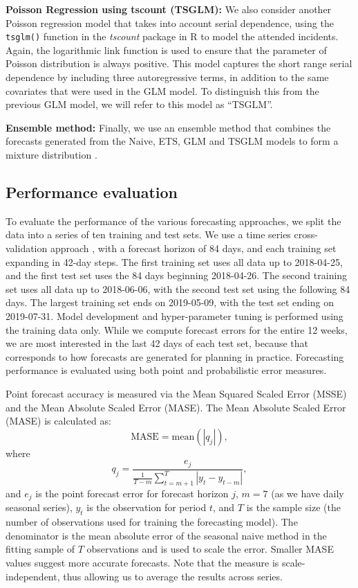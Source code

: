 \documentclass[
  authoryear,
  preprint,
  3p]{elsarticle}
\begin{document}
\textbf{Poisson Regression using tscount (TSGLM):} We also consider
another Poisson regression model that takes into account serial
dependence, using the \texttt{tsglm()} function in the \emph{tscount}
package in R \citep{JSSv082i05} to model the attended incidents. Again,
the logarithmic link function is used to ensure that the parameter of
Poisson distribution is always positive. This model captures the short
range serial dependence by including three autoregressive terms, in
addition to the same covariates that were used in the GLM model. To
distinguish this from the previous GLM model, we will refer to this
model as ``TSGLM''.

\textbf{Ensemble method:} Finally, we use an ensemble method that
combines the forecasts generated from the Naive, ETS, GLM and TSGLM
models to form a mixture distribution \citep{combinations}.

\hypertarget{performance-evaluation}{%
\subsection{Performance evaluation}\label{performance-evaluation}}

To evaluate the performance of the various forecasting approaches, we
split the data into a series of ten training and test sets. We use a
time series cross-validation approach \citep{hyndman2021forecasting},
with a forecast horizon of 84 days, and each training set expanding in
42-day steps. The first training set uses all data up to 2018-04-25, and
the first test set uses the 84 days beginning 2018-04-26. The second
training set uses all data up to 2018-06-06, with the second test set
using the following 84 days. The largest training set ends on
2019-05-09, with the test set ending on 2019-07-31. Model development
and hyper-parameter tuning is performed using the training data only.
While we compute forecast errors for the entire 12 weeks, we are most
interested in the last 42 days of each test set, because that
corresponds to how forecasts are generated for planning in practice.
Forecasting performance is evaluated using both point and probabilistic
error measures.

Point forecast accuracy is measured via the Mean Squared Scaled Error
(MSSE) and the Mean Absolute Scaled Error (MASE). The Mean Absolute
Scaled Error (MASE) \citep{HK06} is calculated as: \[
  \text{MASE} = \text{mean}(|q_{j}|),
\] where \[
  q_{j} = \frac{ e_{j}}
 {\displaystyle\frac{1}{T-m}\sum_{t=m+1}^T |y_{t}-y_{t-m}|},
\] and \(e_{j}\) is the point forecast error for forecast horizon \(j\),
\(m = 7\) (as we have daily seasonal series), \(y_t\) is the observation
for period \(t\), and \(T\) is the sample size (the number of
observations used for training the forecasting model). The denominator
is the mean absolute error of the seasonal naive method in the fitting
sample of \(T\) observations and is used to scale the error. Smaller
MASE values suggest more accurate forecasts. Note that the measure is
scale-independent, thus allowing us to average the results across
series.
\end{document}

